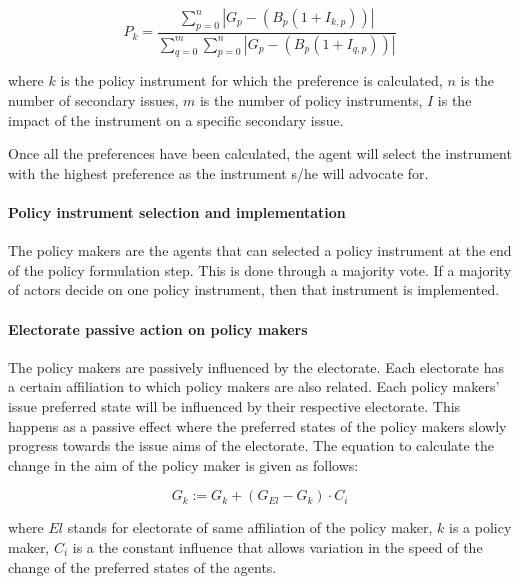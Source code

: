 \documentclass[11pt]{article}
\begin{document}
\begin{equation}
P_k = \frac{\sum_{p = 0}^{n} | G_{p} - \left( B_{p} (1 + I_{k,p}) \right) |}{\sum_{q = 0}^{m} \sum_{p = 0}^{n} | G_{p} - \left( B_{p} (1 + I_{q,p}) \right) |}
\end{equation}

where $k$ is the policy instrument for which the preference is calculated, $n$ is the number of secondary issues, $m$ is the number of policy instruments, $I$ is the impact of the instrument on a specific secondary issue.

Once all the preferences have been calculated, the agent will select the instrument with the highest preference as the instrument s/he will advocate for.


\paragraph{Policy instrument selection and implementation}

The policy makers are the agents that can selected a policy instrument at the end of the policy formulation step. This is done through a majority vote. If a majority of actors decide on one policy instrument, then that instrument is implemented.


\paragraph{Electorate passive action on policy makers}

The policy makers are passively influenced by the electorate. Each electorate has a certain affiliation to which policy makers are also related. Each policy makers' issue preferred state will be influenced by their respective electorate. This happens as a passive effect where the preferred states of the policy makers slowly progress towards the issue aims of the electorate. The equation to calculate the change in the aim of the policy maker is given as follows:

\begin{equation}
G_{k} := G_{k} + \left(G_{El} - G_{k} \right) \cdot C_{i}
\end{equation}

where $El$ stands for electorate of same affiliation of the policy maker, $k$ is a policy maker, $C_i$ is a the constant influence that allows variation in the speed of the change of the preferred states of the agents.
\end{document}

